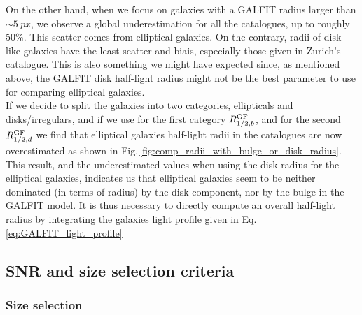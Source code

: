 On the other hand, when we focus on galaxies with a GALFIT radius larger than $\sim \SI{5}{px}$, we observe a global underestimation for all the catalogues, up to roughly 50\%. This scatter comes from elliptical galaxies. On the contrary, radii of disk-like galaxies have the least scatter and biais, especially those given in Zurich's catalogue. This is also something we might have expected since, as mentioned above, the GALFIT disk half-light radius might not be the best parameter to use for comparing elliptical galaxies.  \\

If we decide to split the galaxies into two categories, ellipticals and disks/irregulars, and if we use for the first category $R_{1/2 , b}^{\rm{GF}}$, and for the second $R_{1/2 , d}^{\rm{GF}}$ we find that elliptical galaxies half-light radii in the catalogues are now overestimated as shown in Fig.\,\ref{fig:comp_radii_with_bulge_or_disk_radius}. This result, and the underestimated values when using the disk radius for the elliptical galaxies, indicates us that elliptical galaxies seem to be neither dominated (in terms of radius) by the disk component, nor by the bulge in the GALFIT model. It is thus necessary to directly compute an overall half-light radius by integrating the galaxies light profile given in Eq.\,\ref{eq:GALFIT_light_profile}


























\subsection{SNR and size selection criteria}

\subsubsection{Size selection}

